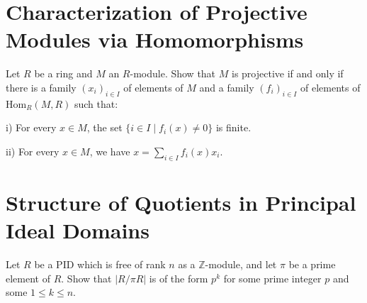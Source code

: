 \documentclass[lang=cn,11pt]{template}
\begin{document}
\section{Characterization of Projective Modules via Homomorphisms}
Let \( R \) be a ring and \( M \) an \( R \)-module. Show that \( M \) is projective if and only if there is a family \( (x_i)_{i \in I} \) of elements of \( M \) and a family \( (f_i)_{i \in I} \) of elements of \( \text{Hom}_R(M, R) \) such that:

i) For every \( x \in M \), the set \( \{ i \in I \mid f_i(x) \neq 0 \} \) is finite.

ii) For every \( x \in M \), we have \( x = \sum_{i \in I} f_i(x)x_i \).

\section{Structure of Quotients in Principal Ideal Domains}
Let \( R \) be a PID which is free of rank \( n \) as a \( \mathbb{Z} \)-module, and let \( \pi \) be a prime element of \( R \). Show that \( |R/\pi R| \) is of the form \( p^k \) for some prime integer \( p \) and some \( 1 \leq k \leq n \).
\end{document}
